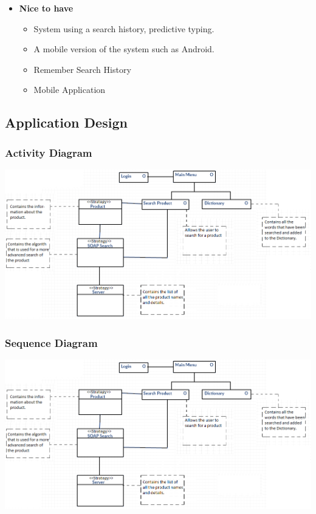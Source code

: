 \documentclass[a4paper,10pt]{article}
\begin{document}
\begin{enumerate}
\begin{itemize}
		\item \textbf{Nice to have}
		\begin{itemize}
		\item System using a search history, predictive typing. 
		\item A mobile version of the system such as Android.
		\item Remember Search History
		\item Mobile Application

		\end{itemize}
\end{itemize}
		\end{enumerate} 
	
	\subsection{Application Design}
	\subsubsection {Activity Diagram}
		 \includegraphics[scale=0.62]{Diagrams/ClassDiagramUpdatedWithDesign.png}\\
		 
	\subsubsection {Sequence Diagram}
		 \includegraphics[scale=0.62]{Diagrams/ClassDiagramUpdatedWithDesign.png}\\
	
\end{document}
